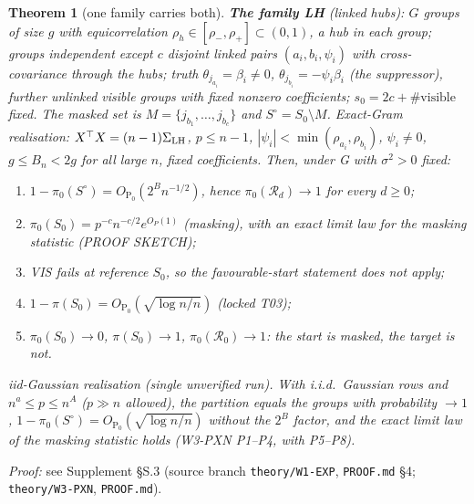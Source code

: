\documentclass[11pt]{article}
\newtheorem{thmpart}{Theorem}[theorem]
\theoremstyle{definition}
\theoremstyle{remark}
\renewcommand{\Pr}{\mathrm{P}}
\newcommand{\Sz}{S_0}
\newcommand{\cR}{\mathcal R}
\begin{document}
\begin{thmpart}[one family carries both]\label{thm:LH}
\textbf{The family LH} (linked hubs): $G$ groups of size $g$ with equicorrelation $\rho_h\in[\rho_-,\rho_+]\subset(0,1)$, a hub in each group;
groups independent except $c$ disjoint \emph{linked pairs} $(a_i,b_i,\psi_i)$ with cross-covariance through the hubs; truth
$\theta_{j_{a_i}}=\beta_i\ne0$, $\theta_{j_{b_i}}=-\psi_i\beta_i$ (the \emph{suppressor}), further unlinked visible groups with fixed
nonzero coefficients; $s_0=2c+\#\text{visible}$ fixed. The masked set is $M=\{j_{b_1},\dots,j_{b_c}\}$ and $S^\circ=\Sz\setminus M$.
\emph{Exact-Gram realisation:} $X^\top X=(n-1)\Sigma_{\rm LH}$, $p\le n-1$, $|\psi_i|<\min(\rho_{a_i},\rho_{b_i})$, $\psi_i\ne0$,
$g\le B_n<2g$ for all large $n$, fixed coefficients. Then, under G with $\sigma^2>0$ fixed:
\begin{enumerate}
\item[(a)] $1-\pi_0(S^\circ)=O_{\Pr_0}(2^Bn^{-1/2})$, hence $\pi_0(\cR_d)\to1$ for every $d\ge0$;
\item[(b)] $\pi_0(\Sz)=p^{-c}n^{-c/2}e^{O_P(1)}$ (masking), with an exact limit law for the masking statistic (PROOF SKETCH);
\item[(c)] VIS fails at reference $\Sz$, so the favourable-start statement does not apply;
\item[(d)] $1-\pi(\Sz)=O_{\Pr_0}(\sqrt{\log n/n})$ (locked T03);
\item[(e)] $\pi_0(\Sz)\to0$, $\pi(\Sz)\to1$, $\pi_0(\cR_0)\to1$: the start is masked, the target is not.
\end{enumerate}
\emph{iid-Gaussian realisation (single unverified run).} With i.i.d.\ Gaussian rows and $n^a\le p\le n^A$ ($p\gg n$ allowed),
the partition equals the groups with probability $\to1$, $1-\pi_0(S^\circ)=O_{\Pr_0}(\sqrt{\log n/n})$ \emph{without} the $2^B$ factor,
and the exact limit law of the masking statistic holds (W3-PXN P1--P4, with P5--P8).
\end{thmpart}
\noindent\emph{Proof:} see Supplement \S S.3 (source branch \texttt{theory/W1-EXP}, \texttt{PROOF.md} \S4; \texttt{theory/W3-PXN}, \texttt{PROOF.md}).
\end{document}
